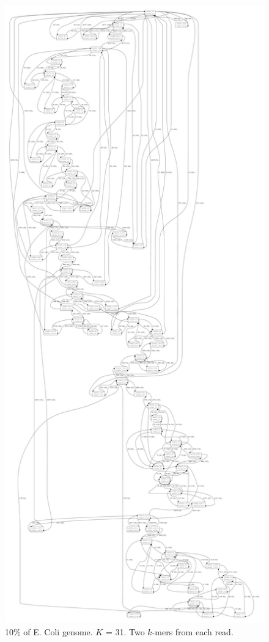 \documentclass[12pt]{article}
\begin{document}
\begin{figure}
\caption{10\% of E. Coli genome. $K$ = 31. Two $k$-mers from each read.}\label{fig4}
\begin{center}\includegraphics[height=0.9\textheight]{fig4.pdf}\end{center}
\end{figure}
\end{document}
